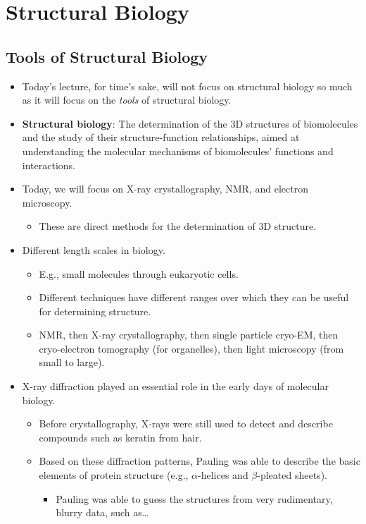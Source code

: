 \documentclass[../notes.tex]{subfiles}
\begin{document}
\chapter{Structural Biology}
\section{Tools of Structural Biology}
\begin{itemize}
    \item Today's lecture, for time's sake, will not focus on structural biology so much as it will focus on the \emph{tools} of structural biology.
    \item \textbf{Structural biology}: The determination of the 3D structures of biomolecules and the study of their structure-function relationships, aimed at understanding the molecular mechanisms of biomolecules' functions and interactions.
    \item Today, we will focus on X-ray crystallography, NMR, and electron microscopy.
    \begin{itemize}
        \item These are direct methods for the determination of 3D structure.
    \end{itemize}
    \item Different length scales in biology.
    \begin{itemize}
        \item E.g., small molecules through eukaryotic cells.
        \item Different techniques have different ranges over which they can be useful for determining structure.
        \item NMR, then X-ray crystallography, then single particle cryo-EM, then cryo-electron tomography (for organelles), then light microscopy (from small to large).
    \end{itemize}
    \item X-ray diffraction played an essential role in the early days of molecular biology.
    \begin{itemize}
        \item Before crystallography, X-rays were still used to detect and describe compounds such as keratin from hair.
        \item Based on these diffraction patterns, Pauling was able to describe the basic elements of protein structure (e.g., $\alpha$-helices and $\beta$-pleated sheets).
        \begin{itemize}
            \item Pauling was able to guess the structures from very rudimentary, blurry data, such as\dots

\end{itemize}
\end{itemize}
\end{itemize}
\end{document}
